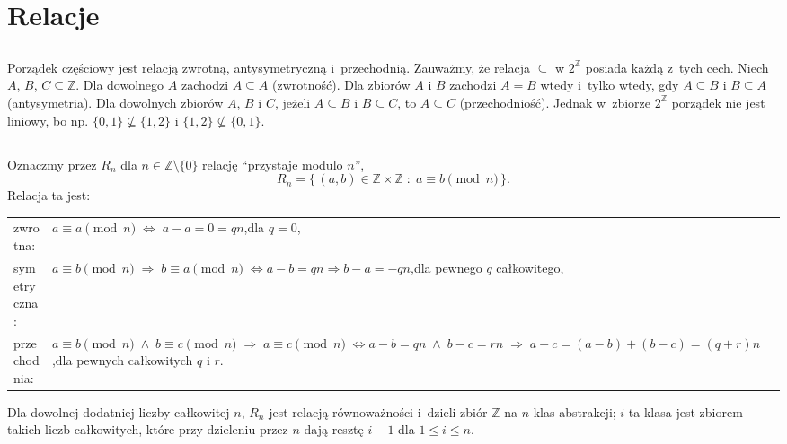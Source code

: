 \section{Relacje}

\subsection{} %
Porządek częściowy jest relacją zwrotną, antysymetryczną i~przechodnią. Zauważmy, że relacja $\subseteq$ w $2^\mathbb{Z}$ posiada każdą z~tych cech. Niech $A$, $B$, $C\subseteq\mathbb{Z}$. Dla dowolnego $A$ zachodzi $A\subseteq A$ (zwrotność). Dla zbiorów $A$ i $B$ zachodzi $A=B$ wtedy i~tylko wtedy, gdy $A\subseteq B$ i $B\subseteq A$ (antysymetria). Dla dowolnych zbiorów $A$, $B$ i $C$, jeżeli $A\subseteq B$ i $B\subseteq C$, to $A\subseteq C$ (przechodniość). Jednak w~zbiorze $2^\mathbb{Z}$ porządek nie jest liniowy, bo np. $\{0,1\}\not\subseteq\{1,2\}$ i $\{1,2\}\not\subseteq\{0,1\}$.

\subsection{} %
Oznaczmy przez $R_n$ dla $n\in\mathbb{Z}\setminus\{0\}$ relację ``przystaje modulo $n$'',
\[
	R_n = \bigl\{\,(a,b)\in\mathbb{Z}\times\mathbb{Z}\;:\;a\equiv b\!\!\!\pmod{n}\,\bigr\}.
\]
Relacja ta jest:\medskip\\
\begin{tabular}{ll}
	zwrotna: & \parbox[t]{3.6in}{$a\equiv a\pmod{n}\;\Leftrightarrow\;a-a=0=qn$,\quad dla $q=0$,} \medskip\\
	symetryczna: & \parbox[t]{3.6in}{$a\equiv b\pmod{n}\;\Rightarrow\;b\equiv a\pmod{n}\;\Leftrightarrow\\a-b=qn\Rightarrow b-a=-qn$,\quad dla pewnego $q$ całkowitego,} \medskip\\
	przechodnia: & \parbox[t]{3.6in}{$a\equiv b\pmod{n}\;\wedge\;b\equiv c\pmod{n}\;\Rightarrow\;a\equiv c\pmod{n}\;\Leftrightarrow\\a-b=qn\;\wedge\;b-c=rn\;\Rightarrow\;a-c=(a-b)+(b-c)=(q+r)n$,\quad dla pewnych całkowitych $q$ i $r$.} \medskip\\
\end{tabular}

Dla dowolnej dodatniej liczby całkowitej $n$, $R_n$ jest relacją równoważności i~dzieli zbiór $\mathbb{Z}$ na $n$ klas abstrakcji; $i$-ta klasa jest zbiorem takich liczb całkowitych, które przy dzieleniu przez $n$ dają resztę $i-1$ dla $1\le i\le n$.

